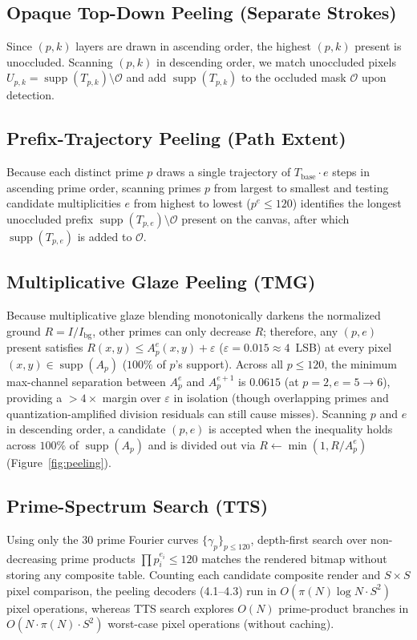 \documentclass[]{interact}
\theoremstyle{plain}
\theoremstyle{definition}
\theoremstyle{remark}
\begin{document}
\subsection{Opaque Top-Down Peeling (Separate Strokes)}
Since $(p, k)$ layers are drawn in ascending order, the highest $(p, k)$ present is unoccluded. Scanning $(p, k)$ in descending order, we match unoccluded pixels $U_{p,k} = \operatorname{supp}(T_{p,k}) \setminus \mathcal{O}$ and add $\operatorname{supp}(T_{p,k})$ to the occluded mask $\mathcal{O}$ upon detection.

\subsection{Prefix-Trajectory Peeling (Path Extent)}
Because each distinct prime $p$ draws a single trajectory of $T_{\mathrm{base}} \cdot e$ steps in ascending prime order, scanning primes $p$ from largest to smallest and testing candidate multiplicities $e$ from highest to lowest ($p^e \le 120$) identifies the longest unoccluded prefix $\operatorname{supp}(T_{p,e}) \setminus \mathcal{O}$ present on the canvas, after which $\operatorname{supp}(T_{p,e})$ is added to $\mathcal{O}$.

\subsection{Multiplicative Glaze Peeling (TMG)}
Because multiplicative glaze blending monotonically darkens the normalized ground $R = I / I_{\mathrm{bg}}$, other primes can only decrease $R$; therefore, any $(p, e)$ present satisfies $R(x,y) \le A_p^e(x,y) + \varepsilon$ ($\varepsilon = 0.015 \approx 4$~LSB) at every pixel $(x,y) \in \operatorname{supp}(A_p)$ ($100\%$ of $p$'s support). Across all $p \le 120$, the minimum max-channel separation between $A_p^e$ and $A_p^{e+1}$ is $0.0615$ (at $p=2, e=5 \to 6$), providing a $>4\times$ margin over $\varepsilon$ in isolation (though overlapping primes and quantization-amplified division residuals can still cause misses). Scanning $p$ and $e$ in descending order, a candidate $(p,e)$ is accepted when the inequality holds across $100\%$ of $\operatorname{supp}(A_p)$ and is divided out via $R \leftarrow \min(1, R / A_p^e)$ (Figure~\ref{fig:peeling}).

\subsection{Prime-Spectrum Search (TTS)}
Using only the $30$ prime Fourier curves $\{\gamma_p\}_{p \le 120}$, depth-first search over non-decreasing prime products $\prod p_i^{e_i} \le 120$ matches the rendered bitmap without storing any composite table. Counting each candidate composite render and $S \times S$ pixel comparison, the peeling decoders (4.1--4.3) run in $O(\pi(N) \log N \cdot S^2)$ pixel operations, whereas TTS search explores $O(N)$ prime-product branches in $O(N \cdot \pi(N) \cdot S^2)$ worst-case pixel operations (without caching).
\end{document}
